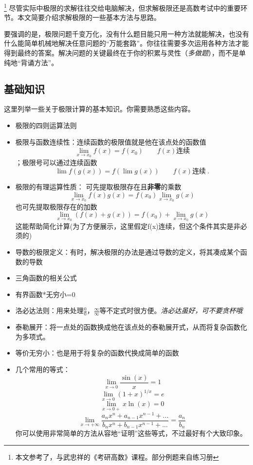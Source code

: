 
\begin{issues}
\issueDraft
\end{issues}
\footnote{本文参考了\cite{同济高}，\cite{Thomas}与武忠祥的《考研高数》课程。部分例题来自练习册}
尽管实际中极限的求解往往交给电脑解决，但求解极限还是高数考试中的重要环节。本文简要介绍求解极限的一些基本方法与思路。

要强调的是，极限问题千变万化，没有什么题目能只用一种方法就能解决，也没有什么能简单机械地解决任意问题的“万能套路”。你往往需要多次运用各种方法才能得到最终的答案。解决问题的关键最终在于你的积累与灵性（\textsl{多做题}），而不是单纯地“背诵方法”。

\subsection{基础知识}
这里列举一些关于极限计算的基本知识。你需要熟悉这些内容。
\begin{itemize}
\item 极限的四则运算法则
\item 极限与函数连续性：连续函数的极限值就是他在该点处的函数值$$\lim _{x \to x_0}f(x) = f(x_0) \qquad f(x)\text{连续}$$；极限号可以通过连续函数 $$\lim f(g(x)) = f(\lim g(x)) \qquad f(x)\text{连续}~.$$
\item 极限的有理运算性质：
可先提取极限存在且\textbf{非零}的乘数 
$$\lim_{x\to x_0} f(x)g(x) = f(x_0)\lim_{x\to x_0} g(x)$$
也可先提取极限存在的加数
$$\lim_{x\to x_0} (f(x)+g(x)) = f(x_0)+\lim_{x\to x_0} g(x)$$
这能帮助简化计算(为了方便展示，这里假定f(x)连续，但这个条件其实是非必须的)
\item 导数的极限定义：有时，解决极限的办法是通过导数的定义，将其凑成某个函数的导数
\item 三角函数的相关公式
\item 有界函数*无穷小=0
\item 洛必达法则：用来处理$\frac{0}{0}$，$\frac{\infty}{\infty}$等不定式时很方便。\textsl{洛必达虽好，可不要贪杯哦}
\item 泰勒展开：将一点处的函数换成他在该点处的泰勒展开式，从而将复杂函数化为多项式。
\item 等价无穷小：也是用于将复杂的函数代换成简单的函数
\item 几个常用的等式：
$$\lim_{x\to0} \frac{\sin(x)}{x}=1$$
$$\lim_{x\to0} (1+x)^{1/x}=e$$
$$\lim_{x\to0+} x\ln(x)=0$$
$$\lim_{x\to+\infty} \frac{a_nx^n+a_{n-1}x^{n-1}+...}{b_nx^n+b_{n-1}x^{n-1}+...}=\frac{a_n}{b_n}$$
你可以使用非常简单的方法从容地“证明”这些等式，不过最好有个大致印象。
\end{itemize}

